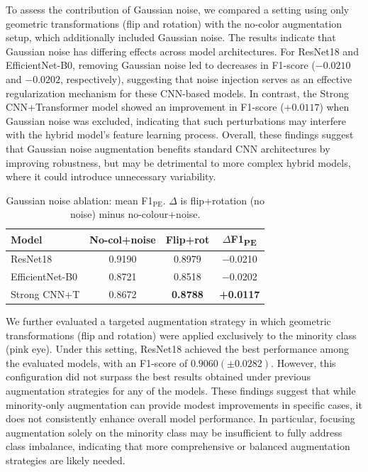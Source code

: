 \documentclass[preprint,12pt,authoryear]{elsarticle}
\begin{document}
To assess the contribution of Gaussian noise, we compared a setting using only geometric transformations (flip and rotation) with the no-color augmentation setup, which additionally included Gaussian noise. The results indicate that Gaussian noise has differing effects across model architectures. For ResNet18 and EfficientNet-B0, removing Gaussian noise led to decreases in F1-score ($-0.0210$ and $-0.0202$, respectively), suggesting that noise injection serves as an effective regularization mechanism for these CNN-based models. In contrast, the Strong CNN+Transformer model showed an improvement in F1-score ($+0.0117$) when Gaussian noise was excluded, indicating that such perturbations may interfere with the hybrid model's feature learning process. Overall, these findings suggest that Gaussian noise augmentation benefits standard CNN architectures by improving robustness, but may be detrimental to more complex hybrid models, where it could introduce unnecessary variability.

\begin{table}
  \caption{Gaussian noise ablation: mean F1$_{\mathrm{PE}}$.
    $\Delta$ is flip+rotation (no noise) minus no-colour+noise.}
  \label{tab:ablation_noise}
  \centering
  \begin{tabular}{lccc}
    \toprule
    \textbf{Model}
      & \textbf{No-col+noise}
      & \textbf{Flip+rot}
      & \textbf{$\Delta$F1\textsubscript{PE}} \\
    \midrule
    ResNet18          & 0.9190 & 0.8979 & $-$0.0210 \\
    EfficientNet-B0   & 0.8721 & 0.8518 & $-$0.0202 \\
    Strong CNN+T      & 0.8672 & \textbf{0.8788} & \textbf{+0.0117} \\
    \bottomrule
  \end{tabular}
\end{table}

We further evaluated a targeted augmentation strategy in which geometric transformations (flip and rotation) were applied exclusively to the minority class (pink eye). Under this setting, ResNet18 achieved the best performance among the evaluated models, with an F1-score of $0.9060 (\pm 0.0282)$. However, this configuration did not surpass the best results obtained under previous augmentation strategies for any of the models. These findings suggest that while minority-only augmentation can provide modest improvements in specific cases, it does not consistently enhance overall model performance. In particular, focusing augmentation solely on the minority class may be insufficient to fully address class imbalance, indicating that more comprehensive or balanced augmentation strategies are likely needed.
\end{document}
